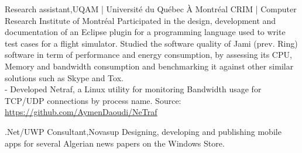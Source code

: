     \resumeSubheading
    {Research assistant,}{UQAM | Université du Québec À Montréal}{}
    {}
      \resumeItemListStart
        \renewcommand{\labelitemii}{\raisebox{.39cm}{$\bullet$}}
        \renewcommand{\labelitemii}{\raisebox{.15cm}{$\bullet$}}
        \renewcommand{\labelitemii}{\raisebox{.25cm}{$\bullet$}}
        \resumeItem
         {CRIM | Computer Research Institute of Montréal}
         {Participated in the design, development and documentation of an Eclipse plugin for a programming language 
          used to write test cases for a flight simulator.}
        \renewcommand{\labelitemii}{\scriptsize \raisebox{.0cm}{\ding{118}}}
        \renewcommand{\labelitemii}{\raisebox{.88cm}{$\bullet$}}
          {Studied the software quality of Jami (prev. Ring) software in term of performance and energy consumption, by assessing 
          its CPU, Memory and bandwidth consumption and benchmarking it against other similar solutions such as Skype and Tox.\\
          - Developed Netraf, a Linux utility for monitoring Bandwidth usage for TCP/UDP connections by process name.
          Source: \underline{\url{https://github.com/AymenDaoudi/NeTraf}}}
        \renewcommand{\labelitemii}{\scriptsize \raisebox{.0cm}{\ding{118}}}
      \resumeItemListEnd

    \resumeSubheading
    {.Net/UWP Consultant,}{Novasup}{}{}
      \resumeItemListStart
      \renewcommand{\labelitemii}{\raisebox{.2cm}{$\bullet$}}
          {Designing, developing and publishing mobile apps for several Algerian news papers on the Windows Store.}
        \renewcommand{\labelitemii}{\scriptsize \raisebox{.0cm}{\ding{118}}}
      \resumeItemListEnd 
    
